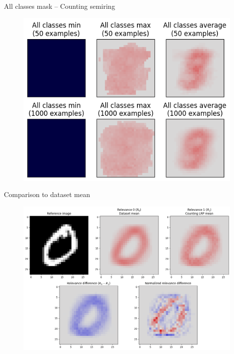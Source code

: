 \documentclass[aspectratio=169]{beamer}
\theoremstyle{definition}
\begin{document}
\begin{frame}{All classes mask -- Counting semiring}
    \begin{figure}
        \includegraphics[width=.6\textwidth]{counting-mask-all.png}
    \end{figure}
\end{frame}

\begin{frame}{Comparison to dataset mean}
    \begin{figure}
        \includegraphics[width=.7\textwidth]{dataset-relevance-cmp.png}
    \end{figure}
\end{frame}
\end{document}
